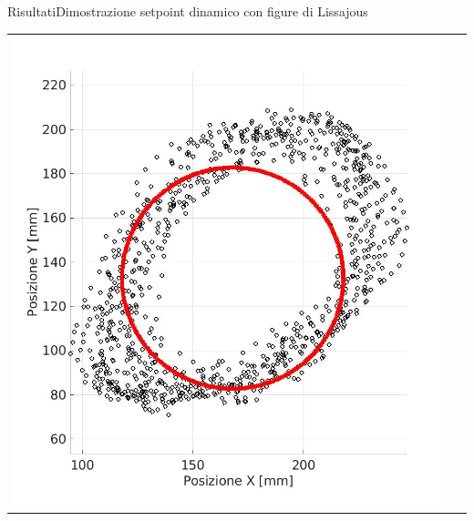 \documentclass[10pt,aspectratio=169
	]{beamer}
\begin{document}
\begin{frame}{Risultati}{Dimostrazione setpoint dinamico con figure di Lissajous}
\begin{tabular}{cc}
  \includegraphics[height=0.4\textheight]{images/cc.jpg}
 \end{tabular}


\end{frame}
\end{document}
